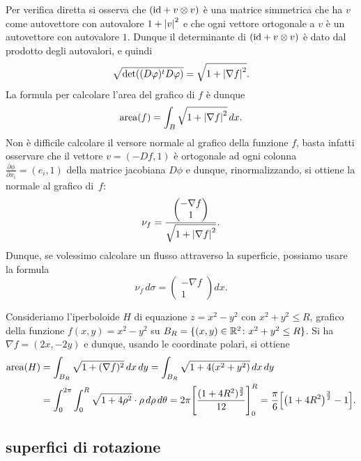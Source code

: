 Per verifica diretta si osserva che 
$(\mathrm{id} + v \otimes v)$ è una matrice simmetrica che 
ha $v$ come autovettore con autovalore $1+{\left|v\right|}^2$ 
e che ogni vettore ortogonale a $v$ è un autovettore con autovalore $1$.
Dunque il determinante di $(\mathrm{id} + v \otimes v)$ è dato dal prodotto degli autovalori,
e quindi
\[
  \sqrt{\det((D\varphi)^t D\varphi)} = \sqrt{1 + {\left|\nabla f\right|}^2}.
\]
La formula per calcolare l'area del grafico di $f$ è dunque
\[
  \operatorname{area}(f) = \int_B \sqrt{1 + {\left|\nabla f\right|}^2}\, dx.
\]
Non è difficile calcolare il versore normale al grafico della funzione 
$f$, basta infatti osservare che il vettore $v=(-D f, 1)$ 
è ortogonale ad ogni colonna $\frac{\partial \phi}{\partial x_i} = (e_i, 1)$ 
della matrice jacobiana $D\phi$ e dunque, rinormalizzando, 
si ottiene la normale al grafico di~$f$:
\[
  \nu_f = \frac{\begin{pmatrix}
  -\nabla f\\
  1
  \end{pmatrix}}{\sqrt{1 + {\left|\nabla f\right|}^2}}.
\]
Dunque, se volessimo calcolare un flusso attraverso la superficie, possiamo usare 
la formula 
\[
  \nu_f\, d\sigma = \begin{pmatrix}
  -\nabla f\\
  1
  \end{pmatrix} dx.
\]

\begin{example}
Consideriamo l'iperboloide $H$ di equazione $z = x^2 - y^2$
 con $x^2+y^2\le R$, grafico della funzione $f(x,y) = x^2 - y^2$ su 
 $B_R = \{(x,y)\in {\mathbb R}^2\colon x^2+y^2\le R\}$.
 Si ha $\nabla f = (2x, -2y)$ e dunque, 
 usando le coordinate polari, 
 si ottiene
 \begin{align*}
 \operatorname{area}(H) 
  &= \int_{B_R} \sqrt{1+(\nabla f)^2}\, dx\, dy
  = \int_{B_R} \sqrt{1 + 4(x^2+y^2)}\, dx\, dy \\
  & = \int_0^{2\pi} \int_0^R \sqrt{1 + 4\rho^2}\cdot \rho\, d\rho\, d\theta
  = 2 \pi {\left[ \frac{(1+4R^2)^{\frac 3 2}}{12} \right]}_0^R
  = \frac{\pi}{6} {\left[ {\left( 1+4R^2 \right)}^{\frac 3 2} - 1 \right]}.
 \end{align*}
\end{example}


\subsection{superfici di rotazione}


